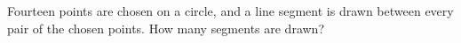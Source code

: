 Fourteen points are chosen on a circle, and a line segment is drawn between every pair of the chosen points. How many segments are drawn?
